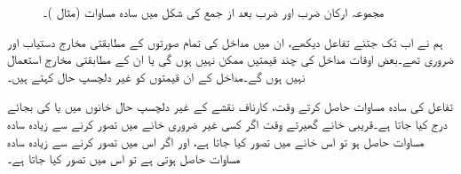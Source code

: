 \begin{figure}
\begin{subfigure}{0.45\textwidth}
\end{subfigure}
\caption{مجموعہ ارکان ضرب اور  ضرب بعد از جمع کی شکل  میں سادہ مساوات (مثال )۔}
\label{شکل_بوولین_متمم_سے_حصول}
\end{figure}

 ہم نے اب تک جتنے تفاعل دیکھے، ان میں مداخل کی تمام صورتوں کے مطابقتی مخارج دستیاب اور ضروری تھے۔بعض اوقات مداخل کی چند قیمتیں ممکن نہیں ہوں گی یا ان کے مطابقتی مخارج استعمال نہیں ہوں گے۔مداخل کے ان قیمتوں کو غیر دلچسپ حال کہتے ہیں۔ 

تفاعل کی سادہ مساوات حاصل کرتے وقت، کارناف نقشے کے غیر دلچسپ حال خانوں میں  یا  کی بجائے  درج کیا جاتا ہے۔قریبی خانے گھیرتے وقت اگر کسی غیر ضروری خانے میں  تصور کرنے سے زیادہ سادہ مساوات حاصل ہو تو اس خانے میں  تصور کیا جاتا ہے، اور اگر اس میں  تصور کرنے سے زیادہ سادہ مساوات حاصل ہوتی ہے تو اس میں  تصور کیا جاتا ہے۔


